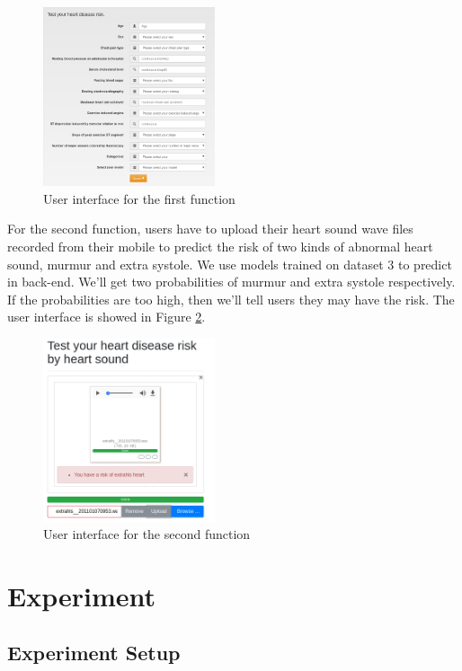 \documentclass[letterpaper]{article} %
\begin{document}
\begin{figure}[!htbp]
\centering\includegraphics[width=0.45\textwidth]{dataset-1-ui}
\caption{User interface for the first function}
\label{fig:dataset-1-ui}
\end{figure}

For the second function, users have to upload their heart sound wave files recorded from their mobile to predict the risk of two kinds of abnormal heart sound, murmur and extra systole. We use models trained on dataset 3 to predict in back-end. We'll get two probabilities of murmur and extra systole respectively. If the probabilities are too high, then we'll tell users they may have the risk. The user interface is showed in Figure \ref{fig:dataset-3-ui}.

\begin{figure}[!htbp]
\centering\includegraphics[width=0.45\textwidth]{dataset-3-ui}
\caption{User interface for the second function}
\label{fig:dataset-3-ui}
\end{figure}

\section{Experiment}

\subsection{Experiment Setup}
\end{document}
